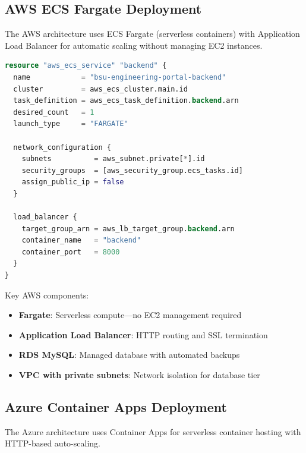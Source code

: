 \subsection{AWS ECS Fargate Deployment}

The AWS architecture uses ECS Fargate (serverless containers) with Application Load Balancer for automatic scaling without managing EC2 instances.

\begin{lstlisting}[float, language=terraform, caption=AWS ECS Service Definition (excerpt from \texttt{ecs.tf})]
resource "aws_ecs_service" "backend" {
  name            = "bsu-engineering-portal-backend"
  cluster         = aws_ecs_cluster.main.id
  task_definition = aws_ecs_task_definition.backend.arn
  desired_count   = 1
  launch_type     = "FARGATE"

  network_configuration {
    subnets          = aws_subnet.private[*].id
    security_groups  = [aws_security_group.ecs_tasks.id]
    assign_public_ip = false
  }

  load_balancer {
    target_group_arn = aws_lb_target_group.backend.arn
    container_name   = "backend"
    container_port   = 8000
  }
}
\end{lstlisting}

Key AWS components:
\begin{itemize}
    \item \textbf{Fargate}: Serverless compute---no EC2 management required
    \item \textbf{Application Load Balancer}: HTTP routing and SSL termination
    \item \textbf{RDS MySQL}: Managed database with automated backups
    \item \textbf{VPC with private subnets}: Network isolation for database tier
\end{itemize}


\subsection{Azure Container Apps Deployment}

The Azure architecture uses Container Apps for serverless container hosting with HTTP-based auto-scaling.

